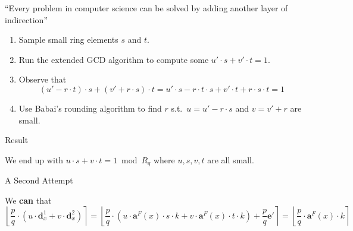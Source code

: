 \documentclass[xcolor=table,10pt,aspectratio=169]{beamer}
\begin{document}
\begin{frame}[label={sec:org697e68a}]{“Every problem in computer science can be solved by adding another layer of indirection”}
\begin{enumerate}
\item Sample small ring elements \(s\) and \(t\).
\item Run the extended GCD algorithm to compute \alert{some} \(u'\cdot s + v'\cdot t = 1\).
\item Observe that \[(u' - r \cdot t)\cdot s + (v'+ r \cdot s)\cdot t = u'\cdot s - r \cdot t \cdot s + v'\cdot t + r \cdot s\cdot t = 1\]
\item Use Babai’s rounding algorithm to find \(r\) s.t. \(u = u' - r \cdot s\) and \(v = v' + r\) are small.
\end{enumerate}

\begin{block}{Result}
\begin{center}
We end up with \(u \cdot s + v \cdot t = 1 \bmod R_q\) where \(u,s,v,t\) are all small.
\end{center}
\end{block}
\end{frame}

\begin{frame}[label={sec:orgad0c1f8}]{A Second Attempt}
\begin{center}
\end{center}

We \textbf{can} that \[\left\lfloor \frac{p}{q} \cdot  \left(u \cdot \mathbf{d}_x^1 + v \cdot \mathbf{d}_x^2 \right) \right\rceil = 
\left\lfloor \frac{p}{q} \cdot  \left(u \cdot \mathbf{a}^F(x) \cdot s \cdot k + v \cdot \mathbf{a}^F(x) \cdot t \cdot k \right) + \frac{p}{q} \mathbf{e}' \right\rceil = \left\lfloor \frac{p}{q} \cdot \mathbf{a}^F(x) \cdot k \right\rceil\]
\end{frame}
\end{document}
